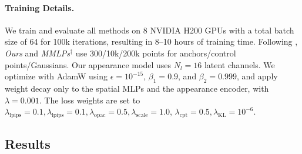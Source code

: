 \documentclass[runningheads]{llncs}
\newcommand{\todo}[1]{\textcolor{todo_color}{#1}}
\newcommand{\losslam}[1]{\lambda_{\text{#1}}}
\begin{document}


\paragraph{Training Details.}

We train and evaluate all methods on 8 NVIDIA H200 GPUs with a total batch size of 64 for 100k iterations, resulting in 8--10 hours of training time.
Following \cite{zhan2025spatialmlps}, \emph{Ours} and \emph{MMLPs$^\dagger$} use 300/10k/200k points for anchors/control points/Gaussians.
Our appearance model uses $N_l{=}16$ latent channels.
We optimize with AdamW using $\epsilon{=}10^{-15}$, $\beta_1{=}0.9$, and $\beta_2{=}0.999$, and apply weight decay only to the spatial MLPs and the appearance encoder, with $\lambda{=}0.001$.
The loss weights are set to $\losslam{lpips}{=}0.1,\losslam{lpips}{=}0.1,\losslam{opac}{=}0.5,\losslam{scale}{=}1.0$,
$\losslam{cpt}{=}0.5,\losslam{KL}{=}10^{-6}$.



\subsection{Results}
\end{document}
